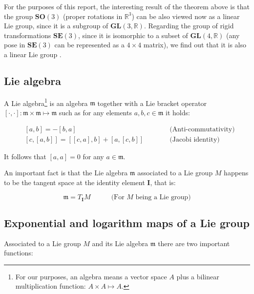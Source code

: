 \documentclass[a4paper,11pt]{report}
\begin{document}
For the purposes of this report, the interesting result of the theorem 
above is that the group $\mathbf{SO}(3)$ (proper rotations in $\mathbb{R}^3$) 
can be also viewed now as a linear Lie group, since it is a 
subgroup of $\mathbf{GL}(3,\mathbb{R})$.
Regarding the group of rigid transformations $\mathbf{SE}(3)$, 
since it is isomorphic to a subset of $\mathbf{GL}(4,\mathbb{R})$
(any pose in $\mathbf{SE}(3)$ can be represented as a $4\times 4$ matrix), 
we find out that it is also a linear Lie group \cite{gallier2001geometric}.


\subsection{Lie algebra}

A Lie algebra\footnote{For our purposes, an algebra means a vector space $A$ plus
a bilinear multiplication function: $A \times A \mapsto A$.}
is an algebra $\mathfrak{m}$ together with a Lie bracket operator
$[\cdot,\cdot]: \mathfrak{m} \times \mathfrak{m} \mapsto \mathfrak{m}$
such as for any elements $a,b,c \in \mathfrak{m}$
it holds:

\begin{eqnarray}
 & [a,b] = -[b,a]   & \quad\quad\quad \text{(Anti-commutativity)} \\
 & \left[ c, \left[a,b \right] \right] = 
\left[ \left[c,a\right] , b \right] + 
\left[ a,\left[c,b\right] \right]  &  \quad\quad\quad \text{(Jacobi identity)} 
\end{eqnarray}

It follows that $[a,a]=0$ for any $a \in \mathfrak{m}$.

An important fact is that the Lie algebra $\mathfrak{m}$ 
associated to a Lie group $M$ happens to be the tangent 
space at the identity element $\mathbf{I}$, that is: 

\begin{equation}
 \mathfrak{m} = T_\mathbf{I} M   \quad\quad\quad\text{(For $M$ being a Lie group)}
\end{equation}



\subsection{Exponential and logarithm maps of a Lie group}
\label{sect:exp_ln}

Associated to a Lie group $M$ and its 
Lie algebra $\mathfrak{m}$ there are 
two important functions:
\end{document}
